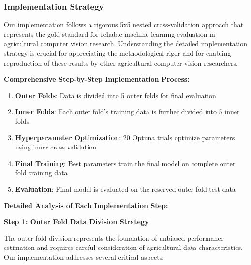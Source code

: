 \subsubsection{Implementation Strategy}

Our implementation follows a rigorous 5x5 nested cross-validation approach that represents the gold standard for reliable machine learning evaluation in agricultural computer vision research. Understanding the detailed implementation strategy is crucial for appreciating the methodological rigor and for enabling reproduction of these results by other agricultural computer vision researchers.

\textbf{Comprehensive Step-by-Step Implementation Process:}

\begin{enumerate}
    \item \textbf{Outer Folds}: Data is divided into 5 outer folds for final evaluation
    \item \textbf{Inner Folds}: Each outer fold's training data is further divided into 5 inner folds
    \item \textbf{Hyperparameter Optimization}: 20 Optuna trials optimize parameters using inner cross-validation
    \item \textbf{Final Training}: Best parameters train the final model on complete outer fold training data
    \item \textbf{Evaluation}: Final model is evaluated on the reserved outer fold test data
\end{enumerate}

\textbf{Detailed Analysis of Each Implementation Step:}

\textbf{Step 1: Outer Fold Data Division Strategy}

The outer fold division represents the foundation of unbiased performance estimation and requires careful consideration of agricultural data characteristics. Our implementation addresses several critical aspects:

